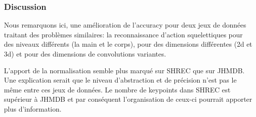 \begin{itemize}
\begin{table}[H]
\centering
{}
\caption{Résulats obtenus grâce à la normalisation DFS sur JHMDB \cite{jhuang2013towards} (Squelettes corps humain 2D) pour un réseau convolutif 2D: Lenet.}
\end{table}
\end{itemize}

\subsubsection{Discussion}

Nous remarquons ici, une amélioration de l'accuracy pour deux jeux de données traitant des problèmes similaires: la reconnaissance d'action squelettiques pour des niveaux différents (la main et le corps), pour des dimensions différentes (2d et 3d) et pour des dimensions de convolutions variantes.

L'apport de la normalisation semble plus marqué sur SHREC que sur JHMDB. Une explication serait que le niveau d'abstraction et de précision n'est pas le même entre ces jeux de données. Le nombre de keypoints dans SHREC est supérieur à JHMDB et par conséquent l'organisation de ceux-ci pourrait apporter plus d'information. 

